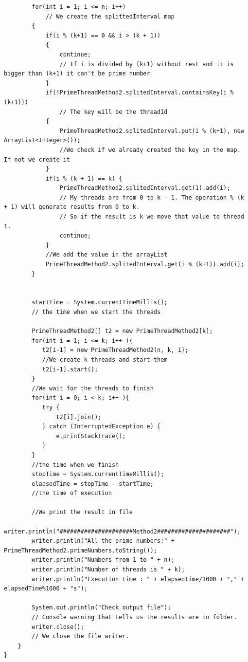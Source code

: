 \documentclass[14pt]{article}
\begin{document}
\begin{lstlisting}
	    for(int i = 1; i <= n; i++)
	    	// We create the splittedInterval map
	    {
	    	if(i % (k+1) == 0 && i > (k + 1))
	    	{
	    		continue; 
	    		// If i is divided by (k+1) without rest and it is bigger than (k+1) it can't be prime number
	    	}
	    	if(!PrimeThreadMethod2.splitedInterval.containsKey(i % (k+1)))
	    		// The key will be the threadId
	    	{
	    		PrimeThreadMethod2.splitedInterval.put(i % (k+1), new ArrayList<Integer>());
	    		//We check if we already created the key in the map. If not we create it
	    	}
	    	if(i % (k + 1) == k) {
	    		PrimeThreadMethod2.splitedInterval.get(1).add(i);
	    		// My threads are from 0 to k - 1. The operation % (k + 1) will generate results from 0 to k.
	    		// So if the result is k we move that value to thread 1.
	    		continue;
	    	}
	    	//We add the value in the arrayList
	    	PrimeThreadMethod2.splitedInterval.get(i % (k+1)).add(i);
	    }
	    
	    
	    startTime = System.currentTimeMillis(); 
	    // the time when we start the threads
	    
	    PrimeThreadMethod2[] t2 = new PrimeThreadMethod2[k];
	    for(int i = 1; i <= k; i++ ){
	       t2[i-1] = new PrimeThreadMethod2(n, k, i);
	       //We create k threads and start them
	       t2[i-1].start();
	    }
	    //We wait for the threads to finish
	    for(int i = 0; i < k; i++ ){
	       try {
	           t2[i].join();
	       } catch (InterruptedException e) {
	           e.printStackTrace();
	       }
	    }
	    //the time when we finish
	    stopTime = System.currentTimeMillis();
	    elapsedTime = stopTime - startTime;
	    //the time of execution
	    
	    //We print the result in file
	    writer.println("#####################Method2#####################");
	    writer.println("All the prime numbers:" + PrimeThreadMethod2.primeNumbers.toString());
	    writer.println("Numbers from 1 to " + n);
	    writer.println("Number of threads is " + k);
	    writer.println("Execution time : " + elapsedTime/1000 + "," + elapsedTime%1000 + "s");
	    
	    System.out.println("Check output file"); 
	    // Console warning that tells us the results are in folder.
	    writer.close(); 
	    // We close the file writer.
	}
}

\end{lstlisting}
\end{document}
